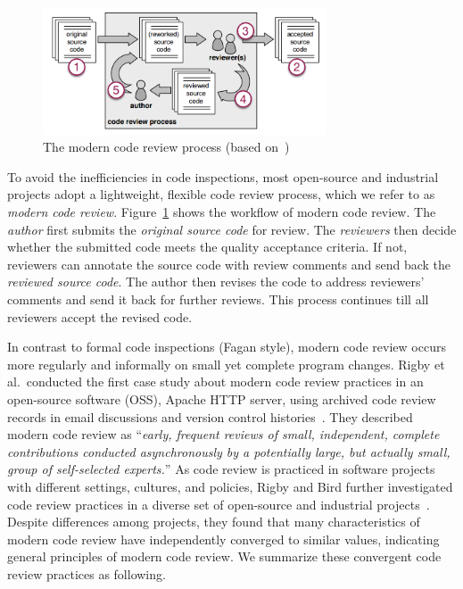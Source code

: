\documentclass[runningheads,a4paper]{llncs}
\begin{document}
\begin{figure}[ht]
 \centering
 \includegraphics[width=0.75\textwidth]{images/review-process.png}
 \caption{The modern code review process (based on~\cite{beller2014modern})}
 \label{fig:review-process}
\end{figure}

To avoid the inefficiencies in code inspections, most open-source and industrial projects adopt a lightweight, flexible code review process, which we refer to as {\em modern code review}. Figure~\ref{fig:review-process} shows the workflow of modern code review. The {\em author} first submits the {\em original source code} for review. The {\em reviewers} then decide whether the submitted code meets the quality acceptance criteria. If not, reviewers can annotate the source code with review comments and send back the {\em reviewed source code}. The author then revises the code to address reviewers' comments and send it back for further reviews. This process continues till all reviewers accept the revised code.

In contrast to formal code inspections (Fagan style), modern code review occurs more regularly and informally on small yet complete program changes. 
Rigby et al.~conducted the first case study about modern code review practices in an open-source software (OSS), Apache HTTP server, using archived code review records in email discussions and version control histories~\cite{rigby2008open}. They described modern code review as ``{\em early, frequent reviews of small, independent, complete contributions conducted asynchronously by a potentially large, but actually small, group of self-selected experts.}'' As code review is practiced in software projects with different settings, cultures, and policies, Rigby and Bird further investigated code review practices in a diverse set of open-source and industrial projects~\cite{rigby2013convergent}. Despite differences among projects, they found that many characteristics of modern code review have independently converged to similar values, indicating general principles of modern code review. We summarize these convergent code review practices as following.
\end{document}
